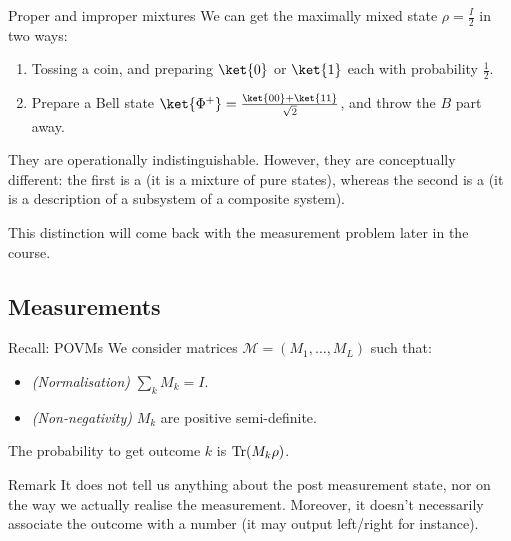 \documentclass[a4paper]{article}
\begin{document}
\begin{parag}{Proper and improper mixtures}
    We can get the maximally mixed state $\rho = \frac{I}{2}$ in two ways:
    \begin{enumerate}
        \item Tossing a coin, and preparing $\ket{0}$ or $\ket{1}$ each with probability $\frac{1}{2}$.
        \item Prepare a Bell state $\ket{\Phi^+} = \frac{\ket{00} + \ket{11}}{\sqrt{2}}$, and throw the $B$ part away.
    \end{enumerate}

    They are operationally indistinguishable. However, they are conceptually different: the first is a  (it is a mixture of pure states), whereas the second is a  (it is a description of a subsystem of a composite system).

    This distinction will come back with the measurement problem later in the course.
\end{parag}

\subsection{Measurements}

\begin{parag}{Recall: POVMs}
    We consider matrices $\mathcal{M} = \left(M_1, \ldots, M_L\right)$ such that: 
    \begin{itemize}
        \item \textit{(Normalisation)} $\sum_{k} M_k = I$.
        \item \textit{(Non-negativity)} $M_k$ are positive semi-definite.
    \end{itemize}

    The probability to get outcome $k$ is $\Tr\left(M_k \rho\right)$.

    \begin{subparag}{Remark}
        It does not tell us anything about the post measurement state, nor on the way we actually realise the measurement. Moreover, it doesn't necessarily associate the outcome with a number (it may output left/right for instance).
    \end{subparag}
\end{parag}
\end{document}
